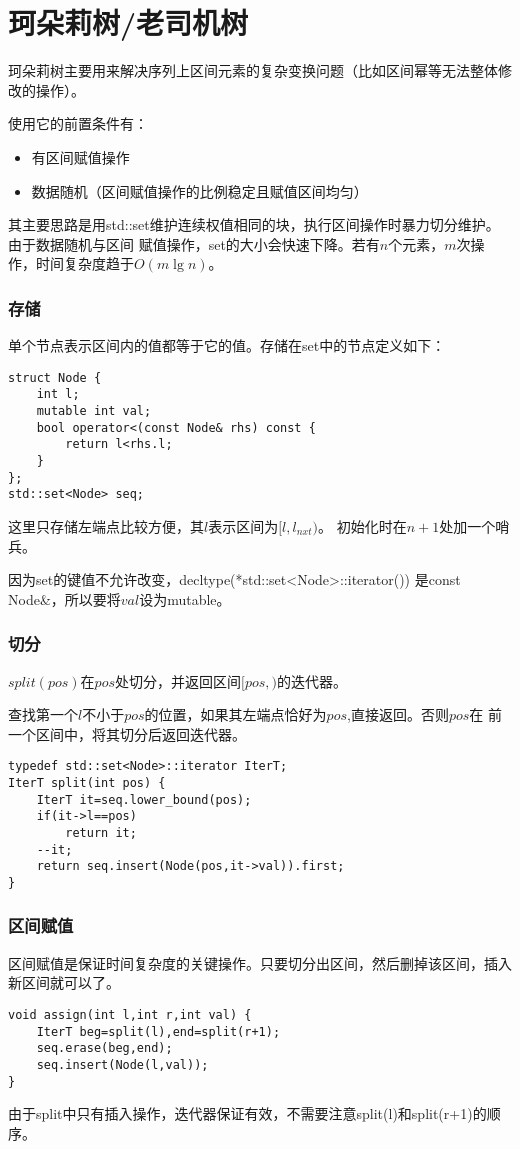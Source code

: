 \section{珂朵莉树/老司机树}
珂朵莉树主要用来解决序列上区间元素的复杂变换问题（比如区间幂等无法整体修改的操作）。

使用它的前置条件有：
\begin{itemize}
    \item 有区间赋值操作
    \item 数据随机（区间赋值操作的比例稳定且赋值区间均匀）
\end{itemize}

其主要思路是用std::set维护连续权值相同的块，执行区间操作时暴力切分维护。由于数据随机与区间
赋值操作，set的大小会快速下降。若有$n$个元素，$m$次操作，时间复杂度趋于$O(m\lg n)$。

\subsubsection{存储}
单个节点表示区间内的值都等于它的值。存储在set中的节点定义如下：
\begin{lstlisting}
struct Node {
    int l;
    mutable int val;
    bool operator<(const Node& rhs) const {
        return l<rhs.l;
    }
};
std::set<Node> seq;
\end{lstlisting}
这里只存储左端点比较方便，其$l$表示区间为$[l,l_{nxt})$。
初始化时在$n+1$处加一个哨兵。

因为set的键值不允许改变，decltype(*std::set<Node>::iterator())
是const Node\&，所以要将$val$设为mutable。
\subsubsection{切分}
$split(pos)$在$pos$处切分，并返回区间$[pos,)$的迭代器。

查找第一个$l$不小于$pos$的位置，如果其左端点恰好为$pos$,直接返回。否则$pos$在
前一个区间中，将其切分后返回迭代器。

\begin{lstlisting}
typedef std::set<Node>::iterator IterT;
IterT split(int pos) {
    IterT it=seq.lower_bound(pos);
    if(it->l==pos)
        return it;
    --it;
    return seq.insert(Node(pos,it->val)).first;
}
\end{lstlisting}
\subsubsection{区间赋值}
区间赋值是保证时间复杂度的关键操作。只要切分出区间，然后删掉该区间，插入
新区间就可以了。
\begin{lstlisting}
void assign(int l,int r,int val) {
    IterT beg=split(l),end=split(r+1);
    seq.erase(beg,end);
    seq.insert(Node(l,val));
}
\end{lstlisting}
由于split中只有插入操作，迭代器保证有效，不需要注意split(l)和split(r+1)的顺序。
